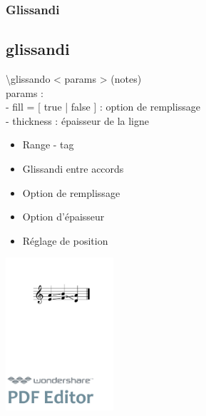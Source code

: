 \documentclass[12pt]{beamer}
\newenvironment{code}
  {\fontfamily{prc}\selectfont}{}
\begin{document}
    \begin{frame}
    \frametitle{Glissandi}
    \subsection{glissandi}
    
    \begin{code} \textbackslash{}glissando \textless{} params \textgreater{} (notes)\\ 
    \hspace{2mm} params :\\
      - fill = [ true | false ] : option de remplissage\\
      - thickness : épaisseur de la ligne
    \end{code}
    
    \vspace{5mm}
    
    \begin{multicols}{2}
    
    \begin{itemize}
      \item Range - tag
      \item Glissandi entre accords
      \item Option de remplissage
      \item Option d'épaisseur
      \item Réglage de position
    \end{itemize}
    
    \columnbreak
    
    \includegraphics[width=4cm]{img/glissandosimple.pdf}
    
    \end{multicols}
    
    \end{frame}

\end{document}
